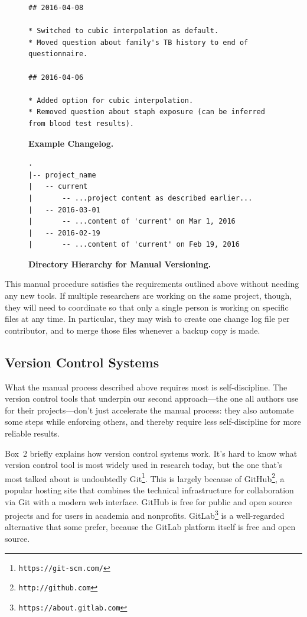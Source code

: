 \documentclass[10pt,letterpaper]{article}
\newcommand{\withurl}[2]{{#1}\footnote{{\texttt{#2}}}}
\begin{document}
\begin{figure}
\caption{\textbf{Example Changelog.}}
{\small
\begin{verbatim}
## 2016-04-08

* Switched to cubic interpolation as default.
* Moved question about family's TB history to end of questionnaire.

## 2016-04-06

* Added option for cubic interpolation.
* Removed question about staph exposure (can be inferred from blood test results).
\end{verbatim}
}
\label{fig:changelog}
\end{figure}

\begin{figure}
\caption{\textbf{Directory Hierarchy for Manual Versioning.}}
{\small
\begin{verbatim}
.
|-- project_name
|   -- current
|       -- ...project content as described earlier...
|   -- 2016-03-01
|       -- ...content of 'current' on Mar 1, 2016
|   -- 2016-02-19
|       -- ...content of 'current' on Feb 19, 2016
\end{verbatim}
}
\label{fig:manual}
\end{figure}

This manual procedure satisfies the requirements outlined above
without needing any new tools. If multiple researchers are working on
the same project, though, they will need to coordinate so that only a
single person is working on specific files at any time. In particular,
they may wish to create one change log file per contributor, and to
merge those files whenever a backup copy is made.

\subsection*{Version Control Systems}

What the manual process described above requires most is
self-discipline. The version control tools that underpin our second
approach---the one all authors use for their projects---don't just
accelerate the manual process: they also automate some steps while
enforcing others, and thereby require less self-discipline for more
reliable results.

Box~2 briefly explains how version control systems work.
It's hard to know what version control tool is most widely used in
research today, but the one that's most talked about is undoubtedly
\withurl{Git}{https://git-scm.com/}. This is largely because of
\withurl{GitHub}{http://github.com}, a popular hosting site that
combines the technical infrastructure for collaboration via Git with
a modern web interface. GitHub is free for public and open source
projects and for users in academia and nonprofits.
\withurl{GitLab}{https://about.gitlab.com} is a well-regarded
alternative that some prefer, because the GitLab platform itself is
free and open source.
\end{document}
